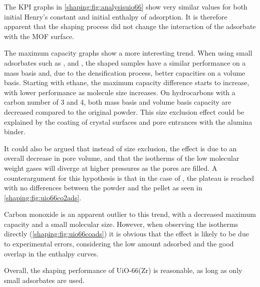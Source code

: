 The \gls{KPI} graphs in \autoref{shaping:fig:analysisuio66} show very
similar values for both initial Henry's constant and initial
enthalpy of adsorption. It is therefore apparent that the shaping process
did not change the interaction of the adsorbate with the \gls{MOF} surface.

The maximum capacity graphs show a more interesting trend.
When using small adsorbates such as ,  and ,
the shaped samples have a similar performance on a mass basis and,
due to the densification process, better capacities on a volume
basis. Starting with ethane, the maximum capacity difference starts
to increase, with lower performance as molecule size increases.
On hydrocarbons with a carbon number of 3 and 4, both mass basis and
volume basis capacity are decreased compared to the original powder.
This size exclusion effect could be explained by the coating of
crystal surfaces and pore entrances with the alumina binder.

It could also be argued that instead of size exclusion, the effect is due to
an overall decrease in pore volume, and that the isotherms of the
low molecular weight gases will diverge at higher pressures
as the pores are filled. A counterargument for this hypothesis is that
in the case of , the plateau is reached with no differences
between the powder and the pellet as seen
in \autoref{shaping:fig:uio66co2ads}.

Carbon monoxide is an apparent outlier to this trend, with a
decreased maximum capacity and a small molecular size.
However, when observing the isotherms directly
(\autoref{shaping:fig:uio66coads}) it is obvious that the effect is
likely to be due to experimental errors, considering
the low amount adsorbed and the good overlap in the enthalpy
curves.

Overall, the shaping performance of UiO-66(Zr) is
reasonable, as long as only small adsorbates are used.
